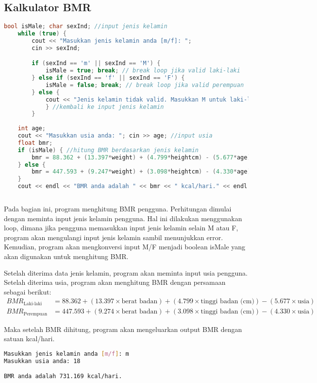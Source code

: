 \documentclass{article}
\begin{document}
\subsection{Kalkulator BMR}
\begin{lstlisting}[language=c++]
    bool isMale; char sexInd; //input jenis kelamin
    while (true) {
        cout << "Masukkan jenis kelamin anda [m/f]: ";
        cin >> sexInd;

        if (sexInd == 'm' || sexInd == 'M') {
            isMale = true; break; // break loop jika valid laki-laki
        } else if (sexInd == 'f' || sexInd == 'F') {
            isMale = false; break; // break loop jika valid perempuan
        } else {
            cout << "Jenis kelamin tidak valid. Masukkan M untuk laki-laki dan F untuk perempuan" << endl;
            } //kembali ke input jenis kelamin
        }
    
    int age;
    cout << "Masukkan usia anda: "; cin >> age; //input usia
    float bmr;
    if (isMale) { //hitung BMR berdasarkan jenis kelamin
        bmr = 88.362 + (13.397*weight) + (4.799*heightcm) - (5.677*age);
    } else {
        bmr = 447.593 + (9.247*weight) + (3.098*heightcm) - (4.330*age);
    }
    cout << endl << "BMR anda adalah " << bmr << " kcal/hari." << endl << endl;
    
\end{lstlisting}
Pada bagian ini, program menghitung BMR pengguna. Perhitungan dimulai dengan meminta input jenis kelamin pengguna. Hal ini dilakukan menggunakan loop, dimana jika pengguna memasukkan input jenis kelamin selain M atau F, program akan mengulangi input jenis kelamin sambil menunjukkan error. Kemudian, program akan mengkonversi input M/F menjadi boolean isMale yang akan digunakan untuk menghitung BMR.

Setelah diterima data jenis kelamin, program akan meminta input usia pengguna. Setelah diterima usia, program akan menghitung BMR dengan persamaan sebagai berikut:
\begin{align}
BMR_{\text{Laki-laki}} &= 88.362 + (13.397 \times \text{berat badan}) + (4.799 \times \text{tinggi badan (cm)}) - (5.677 \times \text{usia}) \\
BMR_{\text{Perempuan}} &= 447.593 + (9.274 \times \text{berat badan}) + (3.098 \times \text{tinggi badan (cm)}) - (4.330 \times \text{usia})
\end{align}

Maka setelah BMR dihitung, program akan mengeluarkan output BMR dengan satuan kcal/hari.
\begin{lstlisting}[language=bash]
Masukkan jenis kelamin anda [m/f]: m
Masukkan usia anda: 18

BMR anda adalah 731.169 kcal/hari.
\end{lstlisting}
\end{document}
